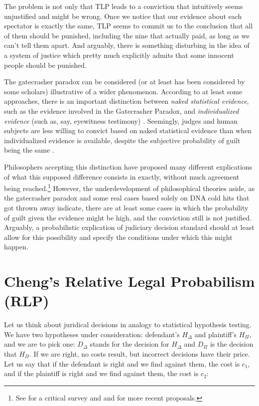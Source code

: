 \documentclass{ifcolog}
\begin{document}
The problem is not only that TLP leads to a conviction that intuitively seems unjustified and might be wrong. Once we notice that our evidence about each spectator is exactly the same, TLP seems to commit us to the conclusion that all of them should be punished, including the nine that actually paid, as long as we can't tell them apart. And arguably, there is something disturbing in the idea of a system of justice which pretty much explicitly admits that some innocent people should be punished.



The gatecrasher paradox can be considered (or at least has been considered by some scholars) illustrative of a wider phenomenon. According to at least some approaches, there is an important distinction between \emph{naked statistical evidence}, such as the evidence involved in the Gatecrasher Paradox, and \emph{individualized evidence} (such as, say, eyewitness testimony) \citep{haack2011legal}. Seemingly, judges and human subjects are less willing to convict based on naked statistical evidence than when individualized evidence is available, despite the subjective probability of guilt being the same \citep{wells1992naked}. 

Philosophers accepting this distinction have proposed many different explications of what this supposed difference consists in exactly, without much agreement being reached.\footnote{See \citep{redmayne2008exploring} for a critical survey and \citep{enoch2015sense} and \citep{smith2017does} for more recent proposals.} However, the underdevelopment of philosophical theories aside, as the gatecrasher paradox and some real cases based solely on DNA cold hits  that got thrown away indicate, there are at least some cases in which the probability of guilt given the evidence might be high, and the  conviction still is not justified. Arguably, a probabilistic explication of judiciary decision standard should at least allow for this possibility and specify the conditions under which this might happen.



 \section{Cheng's Relative Legal Probabilism (RLP)}\label{sec:RLP}

 Let us think about juridical decisions in analogy to statistical hypothesis testing. We have two hypotheses under consideration: defendant's $H_\Delta$ and plaintiff's $H_\Pi$, and we are to pick one: $D_\Delta$ stands for the decision for $H_\Delta$ and $D_\Pi$ is the decision that $H_\Pi$. If we are right, no costs result, but incorrect decisions have their price. Let us say that  if the defendant is right and we find against them, the cost is $c_1$, and if the plaintiff is right and we find against them, the cost is $c_2$:
\end{document}
